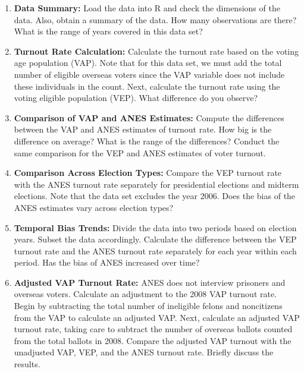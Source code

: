 \documentclass[12pt]{article}
\begin{document}
\begin{enumerate}
    \item \textbf{Data Summary:}
    Load the data into R and check the dimensions of the data. Also, obtain a summary of the data. How many observations are there? What is the range of years covered in this data set?

    \item \textbf{Turnout Rate Calculation:} 
    Calculate the turnout rate based on the voting age population (VAP). Note that for this data set, we must add the total number of eligible overseas voters since the VAP variable does not include these individuals in the count. Next, calculate the turnout rate using the voting eligible population (VEP). What difference do you observe?

    \item \textbf{Comparison of VAP and ANES Estimates:} 
    Compute the differences between the VAP and ANES estimates of turnout rate. How big is the difference on average? What is the range of the differences? Conduct the same comparison for the VEP and ANES estimates of voter turnout.

    \item \textbf{Comparison Across Election Types:} 
    Compare the VEP turnout rate with the ANES turnout rate separately for presidential elections and midterm elections. Note that the data set excludes the year 2006. Does the bias of the ANES estimates vary across election types?
    
    \item \textbf{Temporal Bias Trends:}
    Divide the data into two periods based on election years. Subset the data accordingly. Calculate the difference between the VEP turnout rate and the ANES turnout rate separately for each year within each period. Has the bias of ANES increased over time?

    \item \textbf{Adjusted VAP Turnout Rate:}
    ANES does not interview prisoners and overseas voters. Calculate an adjustment to the 2008 VAP turnout rate. Begin by subtracting the total number of ineligible felons and noncitizens from the VAP to calculate an adjusted VAP. Next, calculate an adjusted VAP turnout rate, taking care to subtract the number of overseas ballots counted from the total ballots in 2008. Compare the adjusted VAP turnout with the unadjusted VAP, VEP, and the ANES turnout rate. Briefly discuss the results.
\end{enumerate}
\vspace{0.3cm}
\end{document}
